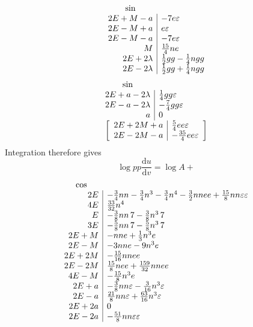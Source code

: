 \[
\begin{array}{r|l}
\multicolumn{1}{c}{\sin}&\\
2E+M-a&-7e\varepsilon\\
2E-M+a&e\varepsilon\\
2E-M-a&-7e\varepsilon\\
M&\tfrac{15}{4}ne\\
2E+2\lambda&\tfrac12gg-\tfrac14ngg\\
2E-2\lambda&\tfrac12gg+\tfrac14ngg
\end{array}
\]
\[
\begin{array}{r|l}
\multicolumn{1}{c}{\sin}&\\
2E+a-2\lambda&\tfrac14gg\varepsilon\\
2E-a-2\lambda&-\tfrac74gg\varepsilon\\
a&0\\
\multicolumn{2}{c}{\left[\begin{array}{r|l}
2E+2M+a&\tfrac54ee\varepsilon\\
2E-2M-a&-\tfrac{35}{4}ee\varepsilon
\end{array}\right]}
\end{array}
\]
\noindent Integration therefore gives
\[
\log pp\frac{\mathrm du}{\mathrm dv}=\log A+
\]
\[
\begin{array}{r|l}
\multicolumn{1}{c}{\cos}&\\
2E&-\tfrac34nn-\tfrac34n^3-\tfrac34n^4-\tfrac32nnee+\tfrac{15}{8}nn\varepsilon\varepsilon\\
4E&\tfrac{33}{32}n^4\\
E&-\tfrac38nn\,7-\tfrac38n^3\,7\\
3E&-\tfrac58nn\,7-\tfrac58n^3\,7\\
2E+M&-nne+\tfrac13n^3e\\
2E-M&-3nne-9n^3e\\
2E+2M&-\tfrac{15}{16}nnee\\
2E-2M&\tfrac{15}{8}nee+\tfrac{159}{32}nnee\\
4E-M&-\tfrac{15}{8}n^3e\\
2E+a&-\tfrac38nn\varepsilon-\tfrac{3}{16}n^3\varepsilon\\
2E-a&\tfrac{21}{8}nn\varepsilon+\tfrac{63}{16}n^3\varepsilon\\
2E+2a&0\\
2E-2a&-\tfrac{51}{8}nn\varepsilon\varepsilon
\end{array}
\]
